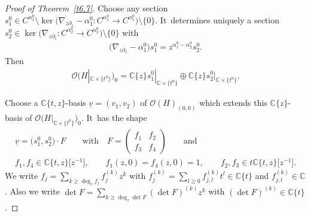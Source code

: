 \documentclass[pdftex]{sigma}%
\numberwithin{equation}{section}
\numberwithin{figure}{section}
\newcommand{\C}{{\mathbb C}}
\newcommand{\OO}{{\mathcal O}}
\newcommand{\uuuu}{\underline}
\newcommand{\paa}{\partial}
\newcommand{\nnn}{\nabla}
\begin{document}
\begin{proof}[Proof of Theorem~\ref{t6.7}]
Choose any section
$s_1^0\in C^{\alpha_1^0}\setminus \ker\big(\nnn_{z\paa_z}-\alpha_1^0\colon C^{\alpha_1^0}
\to C^{\alpha_1^0}\big)\setminus\{0\}$. It~determines uniquely a section
$s_2^0\in \ker\big(\nnn_{z\paa_z}\colon C^{\alpha_2^0}\to C^{\alpha_2^0}\big)\setminus\{0\}$
with
\begin{gather*}%
\big(\nnn_{z\paa_z}-\alpha_1^0\big)s_1^0
=z^{\alpha_1^0-\alpha_2^0}s_2^0.
\end{gather*}
Then
\begin{gather*}%
\OO\big(H|_{\C\times\{t^0\}}\big)_0=\C\{z\}s_1^0|_{\C\times\{t^0\}}
\oplus \C\{z\}s_2^0|_{\C\times\{t^0\}}.
\end{gather*}

{\sloppy
Choose a $\C\{t,z\}$-basis $\uuuu{v}=(v_1,v_2)$ of
$\OO(H)_{(0,0)}$ which extends this $\C\{z\}$-basis of
$\OO\big(H|_{\C\times\{t^0\}}\big)_0$. It~has the shape
\begin{gather}
\uuuu{v}= \big(s_1^0,s_2^0\big)\cdot F\qquad \text{with}\quad
F=\begin{pmatrix} f_1 & f_2\\f_3&f_4\end{pmatrix}
\qquad\text{and}\nonumber
\\
f_1,f_4\in\C\{t,z\}\big[z^{-1}\big],\qquad
f_1(z,0)=f_4(z,0)=1,\qquad
f_2,f_3\in t\C\{t,z\}\big[z^{-1}\big].\label{6.57}
\end{gather}}\noindent
We write $f_j=\sum_{k\geq \deg_zf_j}f_j^{(k)}z^k$ with
$f_j^{(k)}=\sum_{l\geq 0}f_{j,l}^{(k)}t^l\in\C\{t\}$
and $f_{j,l}^{(k)}\in\C$.
Also we write
$\det F=\sum_{k\geq \deg_z\det F}(\det F)^{(k)}z^k$
with $(\det F)^{(k)}\in\C\{t\}$.


\end{proof}
\end{document}

